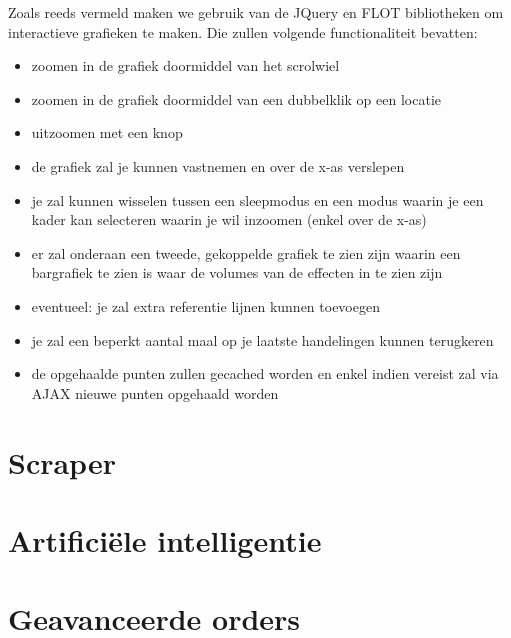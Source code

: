 Zoals reeds vermeld maken we gebruik van de JQuery en FLOT bibliotheken om interactieve grafieken te maken. Die zullen volgende functionaliteit bevatten:
\begin{itemize}
\item{zoomen in de grafiek doormiddel van het scrolwiel}
\item{zoomen in de grafiek doormiddel van een dubbelklik op een locatie}
\item{uitzoomen met een knop}
\item{de grafiek zal je kunnen vastnemen en over de x-as verslepen}
\item{je zal kunnen wisselen tussen een sleepmodus en een modus waarin je een kader kan selecteren waarin je wil inzoomen (enkel over de x-as)}
\item{er zal onderaan een tweede, gekoppelde grafiek te zien zijn waarin een bargrafiek te zien is waar de volumes van de effecten in te zien zijn}
\item{eventueel: je zal extra referentie lijnen kunnen toevoegen}
\item{je zal een beperkt aantal maal op je laatste handelingen kunnen terugkeren}
\item{de opgehaalde punten zullen gecached worden en enkel indien vereist zal via AJAX nieuwe punten opgehaald worden}
\end{itemize}


%
%

\chapter{Scraper}


%
%

\chapter{Artifici\"ele intelligentie}


%
%

\chapter{Geavanceerde orders}


